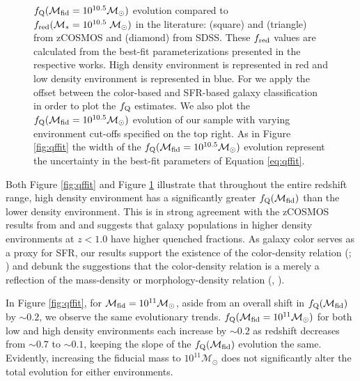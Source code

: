 \documentclass{emulateapj}
\begin{document}
\begin{figure}
    \begin{center}
        \leavevmode
        \caption{$f_{\rm{Q}}(\mathcal{M}_{\rm{fid}}=10^{10.5} \mathcal{M}_\odot)$ evolution compared to $f_{\rm{red}}(\mathcal{M}_{*}=10^{10.5} \; \mathcal{M}_{\odot})$ in the literature: \cite{Iovino:2010aa} (square) and \cite{Kovac:2014aa} (triangle) from zCOSMOS and \cite{Baldry:2006aa} (diamond) from SDSS. These $f_{\rm{red}}$ values are calculated from the best-fit parameterizations presented in the respective works. High density environment is represented in red and low density environment is represented in blue. For \cite{Kovac:2014aa} we apply the offset between the color-based and SFR-based galaxy classification in order to plot the $f_{\rm{Q}}$ estimates. We also plot the $f_{\rm{Q}}(\mathcal{M}_{\rm{fid}} = 10^{10.5} \mathcal{M}_\odot)$ evolution of our sample with varying environment cut-offs specified on the top right. As in Figure \ref{fig:qffit} the width of the $f_{\rm{Q}}(\mathcal{M}_{\rm{fid}} = 10^{10.5} \mathcal{M}_\odot)$ evolution represent the uncertainty in the best-fit parameters of Equation \ref{eq:qffit}.}         \label{fig:qffit_comp}
    \end{center}
\end{figure}

Both Figure \ref{fig:qffit} and Figure \ref{fig:qffit_comp} illustrate that throughout the entire redshift range, high density environment has a significantly greater $f_{\rm{Q}}(\mathcal{M}_{\rm{fid}})$ than the lower density environment. This is in strong agreement with the zCOSMOS results from \cite{Cucciati:2010aa} and \cite{Kovac:2014aa} and suggests that galaxy populations in higher density environments at $z < 1.0$ have higher quenched fractions. As galaxy color serves as a proxy for SFR, our results support the existence of the color-density relation (\cite{Cucciati:2010aa}; \cite{Cooper:2010aa}) and debunk the suggestions that the color-density relation is a merely a reflection of the mass-density or morphology-density relation (\cite{Scodeggio:2009aa}, \cite{Tasca:2009aa}).  

In Figure \ref{fig:qffit}, for $\mathcal{M}_{\rm{fid}} = 10^{11} \mathcal{M}_\odot$, aside from an overall shift in $f_{\rm{Q}}(\mathcal{M}_{\rm{fid}})$ by $\sim 0.2$, we observe the same evolutionary trends. $f_{\rm{Q}}(\mathcal{M}_{\rm{fid}} = 10^{11}\mathcal{M}_{\odot})$ for both low and high density environments each increase by $\sim 0.2$ as redshift decreases from $\sim 0.7$ to $\sim 0.1$, keeping the slope of the $f_{\rm{Q}}(\mathcal{M}_{\rm{fid}})$ evolution the same. Evidently, increasing the fiducial mass to $10^{11} \mathcal{M}_{\odot}$ does not significantly alter the total evolution for either environments. 
\end{document}
